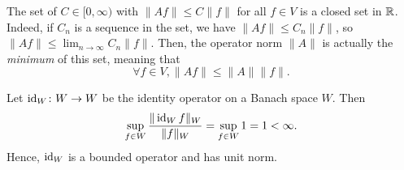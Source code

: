 \begin{remark}
  The set of \(C\in[0,\infty)\) with \(\|Af\|\leq C\|f\|\) for all
  \(f\in V\) is a closed set in \(\mathbb{R}\).
  Indeed, if \(C_n\) is a sequence in the set, we have \(\|Af\|\leq
  C_n\|f\|\), so \(\|Af\|\leq\lim_{n\to\infty}C_n\|f\|\).
  Then, the operator norm \(\|A\|\) is actually the \emph{minimum} of
  this set, meaning that
  \begin{equation}
    \forall f\in V, \|Af\|\leq\|A\|\|f\|
  .\end{equation}
\end{remark}

\begin{example}
Let $\operatorname{id}_W\colon W\to W$ be the identity operator on a Banach space $W$. Then
\begin{equation*}
\sup_{f\in W}\frac{\|\operatorname{id}_Wf\|_W}{\|f\|_W} =\sup_{f\in W}1 = 1 <\infty.
\end{equation*}
Hence, $\operatorname{id}_W$ is a bounded operator and has unit norm.
\end{example}

